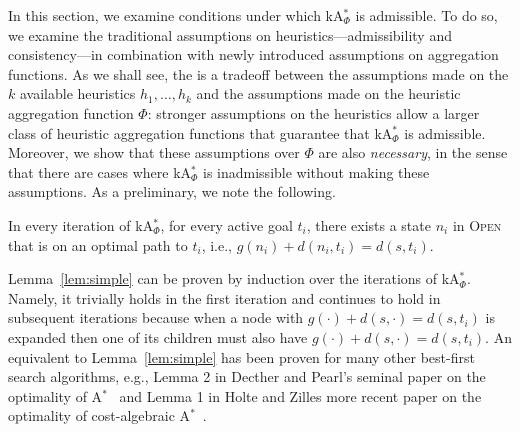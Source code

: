 \documentclass[smallextended]{svjour3}       %
\newcommand{\astar}{A$^*$\xspace}
\newcommand{\kastar}{kA$^*$\xspace}
\newcommand{\kastarvar}[1]{\textup{kA}$^*_{#1}$\xspace}
\newcommand{\kastarmin}{\kastarvar{\min}}
\newcommand{\kastarphi}{\textup{kA}$^*_{\Phi}$\xspace}
\newcommand{\open}{\textsc{Open}\xspace}
\newcommand{\abda}[1]{\textbf{[AS:#1]}}
\begin{document}

In this section, we examine conditions under which \kastarphi is admissible.
To do so, we examine the traditional assumptions on heuristics---admissibility and consistency---in combination with newly introduced assumptions on aggregation functions.
As we shall see, the is a tradeoff between the assumptions made on the $k$ available heuristics $h_1,\ldots,h_k$ and the assumptions made on the heuristic aggregation function $\Phi$: stronger assumptions on the heuristics allow a larger class of heuristic aggregation functions that guarantee that \kastarphi is admissible. Moreover, we show that these assumptions over $\Phi$ are also \emph{necessary}, in the sense that there are cases where \kastarphi is inadmissible without making these assumptions. 
As a preliminary, we note the following. 
\begin{lemma}
  \label{lem:simple}
  In every iteration of \kastarphi, for every active goal $t_i$, there exists a state $n_i$ in \open that is on an optimal path to $t_i$, i.e., $g(n_i) + d(n_i, t_i) = d(s, t_i)$.
\end{lemma}

Lemma~\ref{lem:simple} can be proven by induction over the iterations of \kastarphi. 
Namely, it trivially holds in the first iteration and continues to hold in subsequent iterations because when a node with $g(\cdot) + d(s,\cdot) = d(s, t_i)$ is expanded then one of its children must also have $g(\cdot) + d(s,\cdot) = d(s, t_i)$.
An equivalent to Lemma~\ref{lem:simple} has been proven for many other best-first search algorithms, e.g., Lemma 2 in Decther and Pearl's seminal paper on the optimality of \astar~\cite{dechter1985generalizedBestFirst} 
and Lemma 1 in Holte and Zilles more recent paper on the optimality of cost-algebraic \astar~\cite{holte2019optimal}.  %
\end{document}
